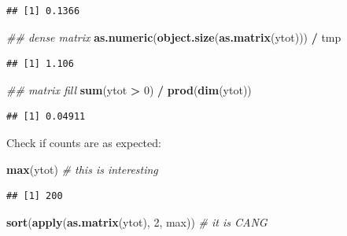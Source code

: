 \documentclass[12pt,]{book}
\newenvironment{Shaded}{\begin{snugshade}}{\end{snugshade}}
\newcommand{\CommentTok}[1]{\textcolor[rgb]{0.56,0.35,0.01}{\textit{#1}}}
\newcommand{\DecValTok}[1]{\textcolor[rgb]{0.00,0.00,0.81}{#1}}
\newcommand{\KeywordTok}[1]{\textcolor[rgb]{0.13,0.29,0.53}{\textbf{#1}}}
\newcommand{\NormalTok}[1]{#1}
\newcommand{\OperatorTok}[1]{\textcolor[rgb]{0.81,0.36,0.00}{\textbf{#1}}}
\newcommand{\StringTok}[1]{\textcolor[rgb]{0.31,0.60,0.02}{#1}}
\begin{document}
\begin{verbatim}
## [1] 0.1366
\end{verbatim}

\begin{Shaded}
\begin{Highlighting}[]
\CommentTok{## dense matrix}
\KeywordTok{as.numeric}\NormalTok{(}\KeywordTok{object.size}\NormalTok{(}\KeywordTok{as.matrix}\NormalTok{(ytot))) }\OperatorTok{/}\StringTok{ }\NormalTok{tmp}
\end{Highlighting}
\end{Shaded}

\begin{verbatim}
## [1] 1.106
\end{verbatim}

\begin{Shaded}
\begin{Highlighting}[]
\CommentTok{## matrix fill}
\KeywordTok{sum}\NormalTok{(ytot }\OperatorTok{>}\StringTok{ }\DecValTok{0}\NormalTok{) }\OperatorTok{/}\StringTok{ }\KeywordTok{prod}\NormalTok{(}\KeywordTok{dim}\NormalTok{(ytot))}
\end{Highlighting}
\end{Shaded}

\begin{verbatim}
## [1] 0.04911
\end{verbatim}

Check if counts are as expected:

\begin{Shaded}
\begin{Highlighting}[]
\KeywordTok{max}\NormalTok{(ytot) }\CommentTok{# this is interesting}
\end{Highlighting}
\end{Shaded}

\begin{verbatim}
## [1] 200
\end{verbatim}

\begin{Shaded}
\begin{Highlighting}[]
\KeywordTok{sort}\NormalTok{(}\KeywordTok{apply}\NormalTok{(}\KeywordTok{as.matrix}\NormalTok{(ytot), }\DecValTok{2}\NormalTok{, max)) }\CommentTok{# it is CANG}
\end{Highlighting}
\end{Shaded}
\end{document}
